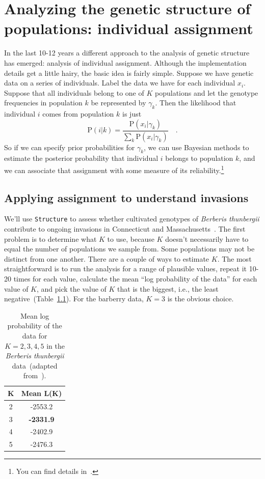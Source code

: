 \chapter{Analyzing the genetic structure of populations: individual assignment}

In the last 10-12 years a different approach to the analysis of
genetic structure has emerged: analysis of individual
assignment. Although the implementation
details get a little hairy, the basic idea is fairly simple. Suppose
we have genetic data on a series of individuals. Label the data we
have for each individual $x_i$. Suppose that all individuals belong to
one of $K$ populations and let the genotype frequencies in population
$k$ be represented by $\gamma_k$. Then the likelihood that individual
$i$ comes from population $k$ is just
\[
\mbox{P}(i|k) = \frac{\mbox{P}(x_i|\gamma_k)}{\sum_k
  \mbox{P}(x_i|\gamma_k)} \quad .
\]
So if we can specify prior probabilities for $\gamma_k$, we can use
Bayesian methods to estimate the posterior probability that individual
$i$ belongs to population $k$, and we can associate that assignment
with some measure of its reliability.\footnote{You can find details
  in~\cite{Pritchard-etal-2000}.}

\section*{Applying assignment to understand invasions}

We'll use {\tt Structure} to assess whether cultivated genotypes of
{\it Berberis thunbergii\/} contribute to ongoing invasions in
Connecticut and
Massachusetts~\cite{Lubell-etal-2008}. The first problem is to determine what $K$
to use, because $K$ doesn't necessarily have to equal the number of
populations we sample from. Some populations may not be distinct from
one another. There are a couple of ways to estimate $K$. The most
straightforward is to run the analysis for a range of plausible
values, repeat it 10-20 times for each value, calculate the mean ``log
probability of the data'' for each value of $K$, and pick the value of
$K$ that is the biggest, i.e., the least
negative~(Table~\ref{table:berberis-k}). For the barberry data, $K=3$
is the obvious choice.

\begin{table}
\begin{center}
\begin{tabular}{cc}
\hline\hline
K & Mean L(K) \\
\hline
2 & -2553.2 \\
3 & {\bf -2331.9} \\
4 & -2402.9 \\
5 & -2476.3 \\
\hline
\end{tabular}
\end{center}
\caption{Mean log probability of the data for $K=2,3,4,5$ in the {\it
    Berberis thunbergii\/} data~(adapted
  from~\cite{Lubell-etal-2008}).}\label{table:berberis-k}
\end{table}


